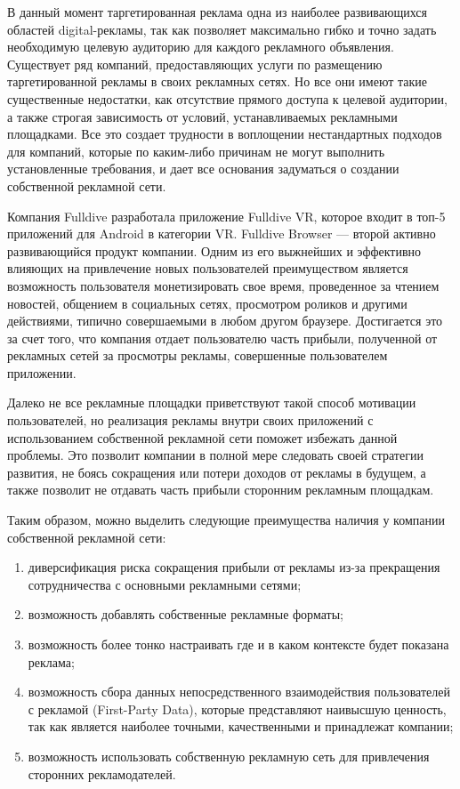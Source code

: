 \documentclass[specification,annotation,times]{itmo-student-thesis}
\begin{document}
В данный момент таргетированная реклама одна из наиболее развивающихся областей digital-рекламы, так как позволяет максимально гибко и точно задать необходимую целевую аудиторию для каждого рекламного объявления. Существует ряд компаний, предоставляющих услуги по размещению таргетированной рекламы в своих рекламных сетях. Но все они имеют такие существенные недостатки, как отсутствие прямого доступа к целевой аудитории, а также строгая зависимость от условий, устанавливаемых рекламными площадками. Все это создает трудности в воплощении нестандартных подходов для компаний, которые по каким-либо причинам не могут выполнить установленные требования, и дает все основания задуматься о создании собственной рекламной сети.

Компания Fulldive разработала приложение Fulldive VR, которое входит в топ-5 приложений для Android в категории VR. Fulldive Browser — второй активно развивающийся продукт компании. Одним из его выжнейших и эффективно влияющих на привлечение новых пользователей преимуществом является возможность пользователя монетизировать свое время, проведенное за чтением новостей, общением в социальных сетях, просмотром роликов и другими действиями, типично совершаемыми в любом другом браузере. Достигается это за счет того, что компания отдает пользователю часть прибыли, полученной от рекламных сетей за просмотры рекламы, совершенные пользователем приложении. 

Далеко не все рекламные площадки приветствуют такой способ мотивации пользователей, но реализация рекламы внутри своих приложений с использованием собственной рекламной сети поможет избежать данной проблемы. Это позволит компании в полной мере следовать своей стратегии развития, не боясь сокращения или потери доходов от рекламы в будущем, а также позволит не отдавать часть прибыли сторонним рекламным площадкам.

Таким образом, можно выделить следующие преимущества наличия у компании собственной рекламной сети:
\begin{enumerate}
	\item диверсификация риска сокращения прибыли от рекламы из-за прекращения сотрудничества с основными рекламными сетями;
	\item возможность добавлять собственные рекламные форматы;
	\item возможность более тонко настраивать где и в каком контексте будет показана реклама;
	\item возможность сбора данных непосредственного взаимодействия пользователей с рекламой (First-Party Data), которые представляют наивысшую ценность, так как является наиболее точными, качественными и принадлежат компании;
	\item возможность использовать собственную рекламную сеть для привлечения сторонних рекламодателей.
\end{enumerate}
\end{document}
